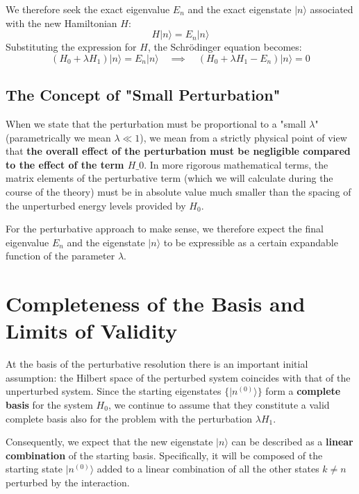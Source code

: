 We therefore seek the exact eigenvalue $E_n$ and the exact eigenstate $\vert{}n\rangle$ associated with the new Hamiltonian $H$:
\begin{equation}
H |n\rangle = E_n |n\rangle
\end{equation}
Substituting the expression for $H$, the Schrödinger equation becomes:
\begin{equation}
(H_0 + \lambda H_1) |n\rangle = E_n |n\rangle \quad \implies \quad (H_0 + \lambda H_1 - E_n) |n\rangle = 0
\end{equation}

\subsection{The Concept of "Small Perturbation"}
When we state that the perturbation must be proportional to a "small $\lambda$" (parametrically we mean $\lambda \ll 1$), we mean from a strictly physical point of view that \textbf{the overall effect of the perturbation must be negligible compared to the effect of the term $H\_0$}. In more rigorous mathematical terms, the matrix elements of the perturbative term (which we will calculate during the course of the theory) must be in absolute value much smaller than the spacing of the unperturbed energy levels provided by $H_0$.

For the perturbative approach to make sense, we therefore expect the final eigenvalue $E_n$ and the eigenstate $\vert{}n\rangle$ to be expressible as a certain expandable function of the parameter $\lambda$.

\section{Completeness of the Basis and Limits of Validity}

At the basis of the perturbative resolution there is an important initial assumption: the Hilbert space of the perturbed system coincides with that of the unperturbed system. Since the starting eigenstates $\{\vert{}n^{(0)}\rangle\}$ form a \textbf{complete basis} for the system $H_0$, we continue to assume that they constitute a valid complete basis also for the problem with the perturbation $\lambda H_1$.

Consequently, we expect that the new eigenstate $\vert{}n\rangle$ can be described as a \textbf{linear combination} of the starting basis. Specifically, it will be composed of the starting state $\vert{}n^{(0)}\rangle$ added to a linear combination of all the other states $k \neq n$ perturbed by the interaction.

